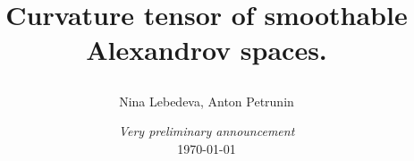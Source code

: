 \documentclass[a4paper,10pt]{article}
\begin{document}
\title{Curvature tensor of smoothable Alexandrov spaces. 
\date{{\it Very preliminary announcement} \\ \today}
}
\author{Nina Lebedeva, Anton Petrunin} 
\maketitle



\tableofcontents













%

%
%
%

\end{document}
